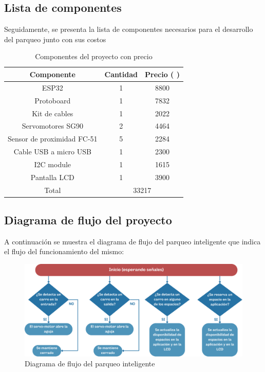 \documentclass[12pt,a4paper]{article}
\DeclareRobustCommand{\Colon}{{%
  \ooalign{%
    \hidewidth\raisebox{0.2ex}{/}\kern0.1em\hidewidth\cr
    C\cr
    \hidewidth\kern0.1em\raisebox{0.2ex}{/}\hidewidth\cr
  }%
}}
\begin{document}
\subsection{Lista de componentes}
Seguidamente, se presenta la lista de componentes necesarios para el desarrollo del parqueo junto con sus costos
\begin{table}[H]
\centering
\begin{tabular}{|c|cc|}
\hline
\textbf{Componente} & \multicolumn{1}{c|}{\textbf{Cantidad}} & \textbf{Precio (\Colon)} \\ \hline
ESP32 & \multicolumn{1}{c|}{1} & 8800 \\ \hline
Protoboard & \multicolumn{1}{c|}{1} & 7832 \\ \hline
Kit de cables & \multicolumn{1}{c|}{1} & 2022 \\ \hline
Servomotores SG90 & \multicolumn{1}{c|}{2} & 4464 \\ \hline
Sensor de proximidad FC-51 & \multicolumn{1}{c|}{5} & 2284 \\ \hline
Cable USB a micro USB & \multicolumn{1}{c|}{1} & 2300 \\ \hline
I2C module & \multicolumn{1}{c|}{1} & 1615 \\ \hline
Pantalla LCD & \multicolumn{1}{c|}{1} & 3900 \\ \hline
Total & \multicolumn{2}{c|}{33217} \\ \hline
\end{tabular}
\caption{Componentes del proyecto con precio}
\label{tab:componentes}
\end{table}

\subsection{Diagrama de flujo del proyecto}
A continuación se muestra el diagrama de flujo del parqueo inteligente que indica el flujo del funcionamiento del mismo:
\begin{figure}[H]
    \centering
    \includegraphics[width=0.8\linewidth]{Imagenes/flow.png}
    \caption{Diagrama de flujo del parqueo inteligente}
    \label{fig:6}
\end{figure}
\end{document}

